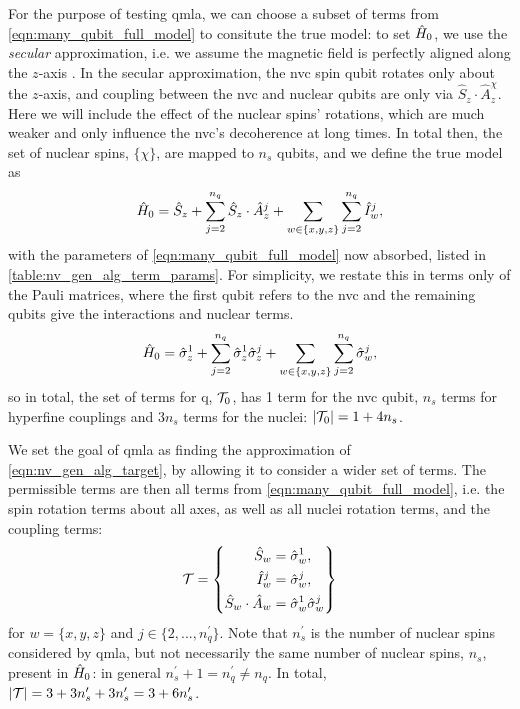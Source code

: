 For the purpose of testing \gls{qmla}, we can choose a subset of terms from \cref{eqn:many_qubit_full_model} to 
    consitute the \gls{true model}: to set $\hat{H}_0$, we use the \emph{secular} approximation, 
    i.e. we assume the magnetic field is perfectly aligned along the $z$-axis \cite{rowan1965electron}.
In the secular approximation, the \gls{nvc} spin qubit rotates only about the $z$-axis, 
    and coupling between the \gls{nvc} and nuclear qubits are only via $\hat{S}_z \cdot \hat{A}_z^{\chi}$.
Here we will include the effect of the nuclear spins' rotations, which are much weaker and only influence the \gls{nvc}'s decoherence at long times. 
In total then, the set of nuclear spins, $\{\chi\}$, are mapped to $n_s$ qubits, 
    and we define the \gls{true model} as 
\begin{equation}
    \hat{H}_0 = \hat{S}_z 
    + \sum\limits_{ j=2 }^{n_q} \hat{S}_z \cdot \hat{A}_z^{j} 
    + \sum\limits_{w \in \{x,y,z\}} \sum\limits_{ j=2 }^{n_q} \hat{I}_w^{j},
\end{equation}
    with the parameters of \cref{eqn:many_qubit_full_model} now absorbed, listed in \cref{table:nv_gen_alg_term_params}.
For simplicity, we restate this in terms only of the Pauli matrices,
    where the first qubit refers to the \gls{nvc} and the remaining qubits give the interactions and nuclear terms.
\begin{equation}
    \label{eqn:nv_gen_alg_target}
    \hat{H}_0 = \hat{\sigma}_{z}^1 
    + \sum\limits_{ j=2 }^{n_q} \hat{\sigma}_{z}^1 \hat{\sigma}_{z}^j 
    + \sum\limits_{w \in \{x,y,z\}} \sum\limits_{ j=2 }^{n_q} \hat{\sigma}_w^j,
\end{equation}
    so in total, the set of terms for \gls{q}, $\mathcal{T}_0$, has 1 term for the \gls{nvc} qubit, $n_s$ terms for hyperfine couplings
    and $3n_s$ terms for the nuclei: $\left\lvert \mathcal{T}_0 \right\rvert = 1 + 4n_s$.
\par 

We set the goal of \gls{qmla} as finding the approximation of \cref{eqn:nv_gen_alg_target},
    by allowing it to consider a wider set of terms. 
The permissible terms are then all terms from \cref{eqn:many_qubit_full_model}, 
    i.e. the spin rotation terms about all axes, 
    as well as all nuclei rotation terms, and the coupling terms:
\begin{equation}
    \mathcal{T} = \left\{ 
        \begin{split}    
            \hat{S}_w &= \hat{\sigma}_w^{1}, \\
            \hat{I}_w^{j} &= \hat{\sigma}_w^{j}, \\
            \hat{S}_w \cdot \hat{A}_w &= \hat{\sigma}_w^1 \hat{\sigma}_w^j
        \end{split}
    \right\}
    \label{eqn:nv_ga_terms}
\end{equation}
    for $w=\{ x, y, z \}$ and $j \in \{ 2, ..., n_q^{\prime} \}$.
Note that $n_s^{\prime}$ is the number of nuclear spins considered by \gls{qmla}, but not necessarily the 
    same number of nuclear spins, $n_s$, present in $\hat{H}_0$:
    in general $n_s^{\prime}+1 = n_q^{\prime} \neq n_q$.
In total, $\left\lvert \mathcal{T} \right\rvert = 3 + 3n_s^{\prime} + 3 n_s^{\prime} = 3 + 6 n_s^{\prime}$. 

